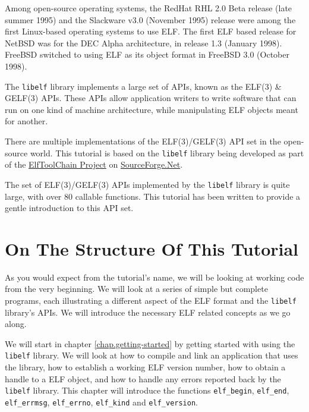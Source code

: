 \documentclass[a4paper,pdftex]{book}
\newcommand{\elftoolchainproject}{\href{https://elftoolchain.sourceforge.io/}%
    {ElfToolChain Project}\xspace}
\newcommand{\function}[1]{\texttt{#1}}
\newcommand{\library}[1]{\texttt{#1}}
\newcommand{\reg}{\textregistered\xspace}
\newcommand{\trade}{\texttrademark\xspace}
\begin{document}
Among open-source operating systems, the RedHat\trade RHL 2.0 Beta
release (late summer 1995) and the Slackware v3.0 (November 1995)
release were among the first Linux\reg-based operating systems to
use ELF.  The first ELF based release for NetBSD\trade was for the DEC
Alpha\trade architecture, in release 1.3 (January 1998).
FreeBSD\trade switched to using ELF as its object format in FreeBSD
3.0 (October 1998).

The \library{libelf} library implements a large set of APIs, known as
the ELF(3) \& GELF(3) APIs. \index{libelf@\library{libelf}!purpose of}
These APIs allow application writers to write software that can run on
one kind of machine architecture, while manipulating ELF objects meant
for another.

There are multiple implementations of the ELF(3)/GELF(3) API set in
the open-source world.  This tutorial is based on the \library{libelf}
library being developed as part of the \elftoolchainproject on
\href{https://sourceforge.net/}{SourceForge.Net}.

The set of ELF(3)/GELF(3) APIs implemented by the \library{libelf}
library is quite large, with over 80 callable functions.  This
tutorial has been written to provide a gentle introduction to this API
set.

\section{On The Structure Of This Tutorial}

As you would expect from the tutorial's name, we will be looking at
working code from the very beginning. We will look at a series of
simple but complete programs, each illustrating a different aspect of
the ELF format and the \library{libelf} library's APIs. We will
introduce the necessary ELF related concepts as we go along.

We will start in chapter \vref{chap.getting-started} by getting
started with using the \library{libelf} library. We will look at how
to compile and link an application that uses the library, how to
establish a working ELF version number, how to obtain a handle to a
ELF object, and how to handle any errors reported back by the
\library{libelf} library.  This chapter will introduce the functions
\function{elf\_begin}, \function{elf\_end}, \function{elf\_errmsg},
\function{elf\_errno}, \function{elf\_kind} and
\function{elf\_version}.
\end{document}
